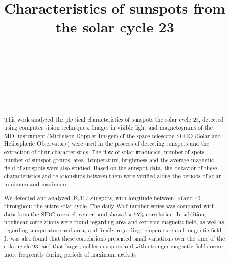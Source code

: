 \documentclass[namedreferences]{solarphysics}
\begin{document}
\begin{article}
\begin{opening}

\title{Characteristics of sunspots from the solar cycle 23}

\author[addressref=aff1]{~}%
\author[addressref=aff2]{~}%
\author[addressref=aff3]{~}%
\author[addressref={aff1,aff2},corref,email={adrivalio@gmail.com}]{~}%

\address[id=aff1]{Centro de Rádio Astronomia e Astrofísica Mackenzie}
\address[id=aff2]{Escola de Engenharia Universidade Presbiteriana Mackenzie São Paulo Brazil}
\address[id=aff3]{Universidade Cruzeiro do Sul}


\begin{abstract}
This work analyzed the physical characteristics of sunspots the solar cycle 23, detected using computer vision techniques.
Images in visible light and
magnetograms of the MDI instrument (Michelson Doppler Imager) of the space telescope
SOHO (Solar and Heliospheric Observatory) were used in the process of detecting
sunspots and the extraction of their characteristics. The flow of
solar irradiance, number of spots, number of sunspot groups, area, temperature, brightness and
the average magnetic field of sunspots were also studied. Based on the sunspot data, the behavior of these characteristics and relationships between them were verified along the
periods of solar minimum and maximum.

We detected and analyzed 32,317 sunspots, with longitude between -40\degree and 40\degree, throughout the entire solar cycle.
The daily Wolf number series was compared with data from the SIDC research center, and showed a 95\% correlation.
In addition, nonlinear correlations were found regarding area and extreme magnetic field, as well as regarding temperature and area, and finally regarding temperature and magnetic field.
It was also found that these correlations presented small variations over the time of the solar cycle 23, and that larger, colder sunspots and with stronger magnetic fields occur more frequently during periods of maximum activity.
\end{abstract}
\end{opening}


\end{article}
\end{document}

